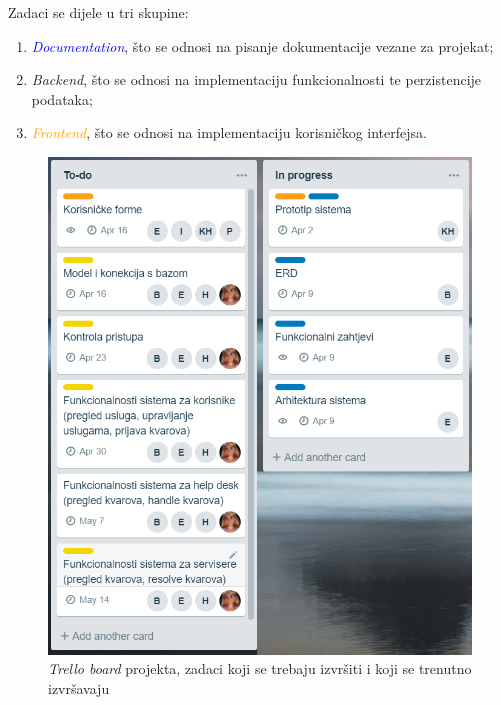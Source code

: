 \documentclass[12pt,a4paper]{article}
\begin{document}
Zadaci se dijele u tri skupine:
\begin{enumerate}
\item \textcolor{blue}{\textit{Documentation}}, što se odnosi na pisanje dokumentacije vezane za projekat;
\item \textcolor{amber}{\textit{Backend}}, što se odnosi na implementaciju funkcionalnosti te perzistencije podataka;
\item \textcolor{orange}{\textit{Frontend}}, što se odnosi na implementaciju korisničkog interfejsa.
\end{enumerate}

\begin{figure}[H]
\center
\includegraphics[scale=0.6]{../res/Trello/trello1.PNG}
\caption{\textit{Trello board} projekta, zadaci koji se trebaju izvršiti i koji se trenutno izvršavaju}
\label{trello1}
\end{figure}
\end{document}
